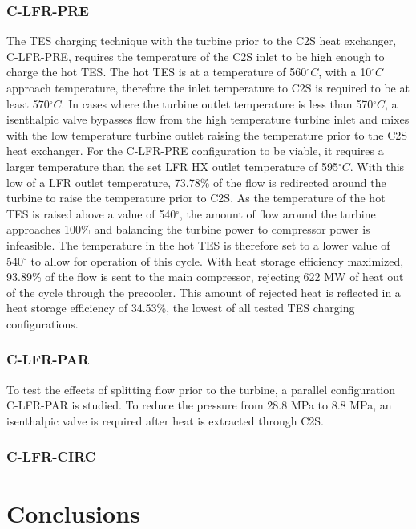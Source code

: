 \begin{paracol}{2}
\linenumbers
\switchcolumn

\subsubsection{C-LFR-PRE}
The TES charging technique with the turbine prior to the C2S heat exchanger, C-LFR-PRE, requires the temperature of the C2S inlet to be high enough to charge the hot TES. The hot TES is at a temperature of 560$^{\circ}C$, with a 10$^{\circ}C$ approach temperature, therefore the inlet temperature to C2S is required to be at least 570$^{\circ}C$. In cases where the turbine outlet temperature is less than 570$^{\circ}C$, a isenthalpic valve bypasses flow from the high temperature turbine inlet and mixes with the low temperature turbine outlet raising the temperature prior to the C2S heat exchanger. For the C-LFR-PRE configuration to be viable, it requires a larger temperature than the set LFR HX outlet temperature of 595$^{\circ}C$. With this low of a LFR outlet temperature, 73.78\% of the flow is redirected around the turbine to raise the temperature prior to C2S. As the temperature of the hot TES is raised above a value of 540$^{\circ}$, the amount of flow around the turbine approaches 100\% and balancing the turbine power to compressor power is infeasible. The temperature in the hot TES is therefore set to a lower value of 540$^{\circ}$ to allow for operation of this cycle. With heat storage efficiency maximized, 93.89\% of the flow is sent to the main compressor, rejecting 622 MW of heat out of the cycle through the precooler. This amount of rejected heat is reflected in a heat storage efficiency of 34.53\%, the lowest of all tested TES charging configurations.

\subsubsection{C-LFR-PAR}

To test the effects of splitting flow prior to the turbine, a parallel configuration C-LFR-PAR is studied. To reduce the pressure from 28.8 MPa to 8.8 MPa, an isenthalpic valve is required after heat is extracted through C2S. 



\subsubsection{C-LFR-CIRC}

\section{Conclusions}


\end{paracol}




